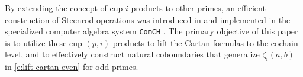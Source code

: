 By extending the concept of cup-$i$ products to other primes, an efficient construction of Steenrod operations was introduced in \cite{medina2021may_st} and implemented in the specialized computer algebra system \texttt{ComCH} \cite{medina2021comch}.
The primary objective of this paper is to utilize these cup-$(p,i)$ products to lift the Cartan formulas to the cochain level, and to effectively construct natural coboundaries that generalize $\zeta_i(a,b)$ in \cref{e:lift cartan even} for odd primes.